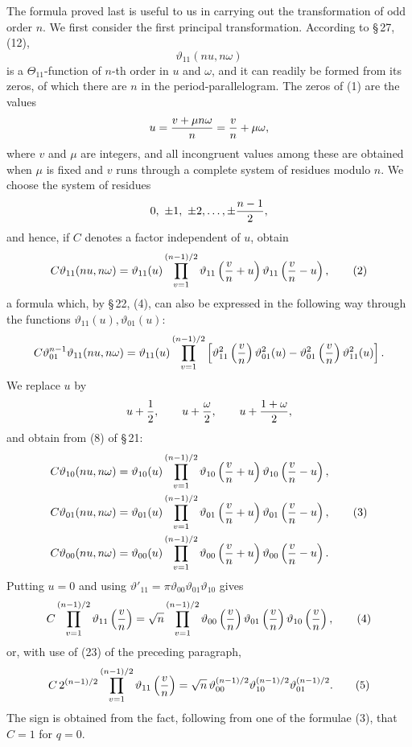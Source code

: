 \documentclass[11pt]{article}
\providecommand{\tht}{\vartheta}
\begin{document}
The formula proved last is useful to us in carrying out the transformation of odd order $n$. We first consider the first principal transformation. According to \S\,27, (12),
\begin{equation}
\tht_{11}(nu,n\omega) \tag{1}
\end{equation}
is a $\Theta_{11}$-function of $n$-th order in $u$ and $\omega$, and it can readily be formed from its zeros, of which there are $n$ in the period-parallelogram. The zeros of (1) are the values
\[
u={v+\mu n\omega\over n}={v\over n}+\mu\omega,
\]
where $v$ and $\mu$ are integers, and all incongruent values among these are obtained when $\mu$ is fixed and $v$ runs through a complete system of residues modulo $n$. We choose the system of residues
\[
0,\ \pm1,\ \pm2,\ldots,\pm{n-1\over2},
\]
and hence, if $C$ denotes a factor independent of $u$, obtain
\begin{equation}
C\tht_{11}(nu,n\omega)=\tht_{11}(u)\prod_{v=1}^{(n-1)/2}
\tht_{11}\left({v\over n}+u\right)
\tht_{11}\left({v\over n}-u\right), \tag{2}
\end{equation}
a formula which, by \S\,22, (4), can also be expressed in the following way through the functions $\tht_{11}(u),\tht_{01}(u)$:
\[
C\tht_{01}^{n-1}\tht_{11}(nu,n\omega)
=\tht_{11}(u)\prod_{v=1}^{(n-1)/2}
\left[\tht_{11}^2\left({v\over n}\right)\tht_{01}^2(u)-\tht_{01}^2\left({v\over n}\right)\tht_{11}^2(u)\right].
\]
We replace $u$ by
\[
u+{1\over2},\qquad u+{\omega\over2},\qquad u+{1+\omega\over2},
\]
and obtain from (8) of \S\,21:
\begin{align}
C\tht_{10}(nu,n\omega)&=\tht_{10}(u)\prod_{v=1}^{(n-1)/2}
\tht_{10}\left({v\over n}+u\right)
\tht_{10}\left({v\over n}-u\right),\notag\\
C\tht_{01}(nu,n\omega)&=\tht_{01}(u)\prod_{v=1}^{(n-1)/2}
\tht_{01}\left({v\over n}+u\right)
\tht_{01}\left({v\over n}-u\right), \tag{3}\\
C\tht_{00}(nu,n\omega)&=\tht_{00}(u)\prod_{v=1}^{(n-1)/2}
\tht_{00}\left({v\over n}+u\right)
\tht_{00}\left({v\over n}-u\right).\notag
\end{align}
Putting $u=0$ and using $\tht'_{11}=\pi\tht_{00}\tht_{01}\tht_{10}$ gives
\begin{equation}
C\prod_{v=1}^{(n-1)/2}\tht_{11}\left({v\over n}\right)
=\sqrt n\prod_{v=1}^{(n-1)/2}
\tht_{00}\left({v\over n}\right)\tht_{01}\left({v\over n}\right)\tht_{10}\left({v\over n}\right), \tag{4}
\end{equation}
or, with use of (23) of the preceding paragraph,
\begin{equation}
C\,2^{(n-1)/2}\prod_{v=1}^{(n-1)/2}\tht_{11}\left({v\over n}\right)
=\sqrt n\,\tht_{00}^{(n-1)/2}\tht_{10}^{(n-1)/2}\tht_{01}^{(n-1)/2}. \tag{5}
\end{equation}
The sign is obtained from the fact, following from one of the formulae (3), that $C=1$ for $q=0$.
\end{document}
